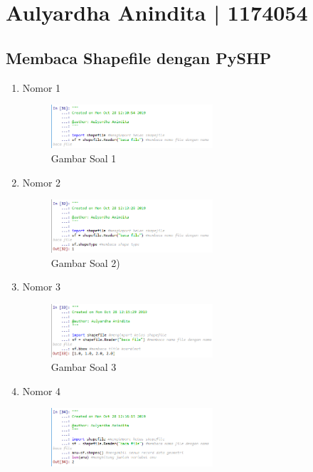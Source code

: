 \section{Aulyardha Anindita | 1174054}
\subsection{Membaca Shapefile dengan PySHP}
\begin{enumerate}
 \item Nomor 1
 
 \begin{figure}[H]
  \includegraphics[width=6cm]{figures/Tugas3/1174054/no1.png}
  \centering
  \caption{Gambar Soal 1}
 \end{figure}
 \item Nomor 2
 
 \begin{figure}[H]
  \includegraphics[width=6cm]{figures/Tugas3/1174054/no2.png}
  \centering
  \caption{Gambar Soal 2)}
 \end{figure}
 \item Nomor 3
 
 \begin{figure}[H]
  \includegraphics[width=6cm]{figures/Tugas3/1174054/no3.png}
  \centering
  \caption{Gambar Soal 3}
 \end{figure}
 \item Nomor 4
 
 \begin{figure}[H]
  \includegraphics[width=6cm]{figures/Tugas3/1174054/no4.png}

\end{figure}
\end{enumerate}
